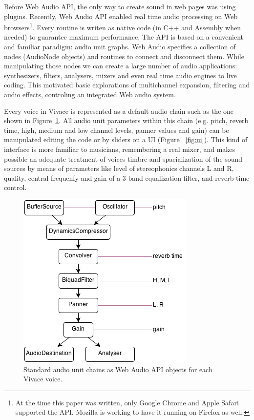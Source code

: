 \documentclass[letterpaper, 12pt]{article}
\begin{document}
Before Web Audio API, the only way to create sound in web pages was
using plugins. Recently, Web Audio API enabled real time audio
processing on Web browsers\footnote{At the time this paper was
  written, only Google Chrome and Apple Safari supported the
  API. Mozilla is working to have it running on Firefox as
  well.}. Every routine is writen as native code (in C++ and Assembly
when needed) to guarantee maximum performance. The API is based on a
convenient and familiar paradigm: audio unit graphs. Web Audio
specifies a collection of nodes (AudioNode objects) and routines to
connect and disconnect them. While manipulating those nodes we can
create a large number of audio applications: synthesizers, filters,
analysers, mixers and even real time audio engines to live
coding. This motivated basic explorations of multichannel expansion,
filtering and audio effects, controling an integrated Web audio
system.

Every voice in Vivace is represented as a default audio chain such as
the one shown in Figure~\ref{fig:chain}. All audio unit parameters
within this chain (e.g. pitch, reverb time, high, medium and low
channel levels, panner values and gain) can be manipulated editing the
code or by sliders on a UI (Figure ~\ref{fig:ui}). This kind of
interface is more familiar to musicians, remembering a real mixer, and
makes possible an adequate treatment of voices timbre and
spacialization of the sound sources by means of parameters like level
of stereophonics channels L and R, quality, central frequenfy and gain
of a 3-band equalization filter, and reverb time control.

\begin{figure}[htpb]
  \begin{center}
    \includegraphics[scale=.5]{img/fig_chain.png}
    \caption{Standard audio unit chains as Web Audio API objects for
      each Vivace voice.}
    \label{fig:chain}
  \end{center}
\end{figure}
\end{document}
